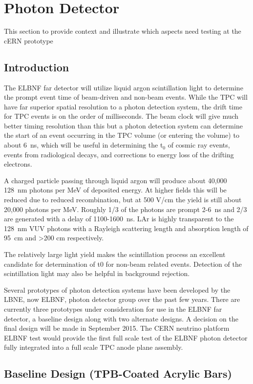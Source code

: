 \section{Photon Detector}
This section to provide context and illustrate which aspects need testing at the cERN prototype

\subsection{Introduction}

The ELBNF far detector will utilize liquid argon scintillation light to determine the prompt event time of beam-driven and non-beam events. While the TPC will have far superior spatial resolution to a photon detection system, the drift time for TPC events is on the order of milliseconds. The beam clock will give much better timing resolution than this but a photon detection system can determine the start of an event occurring in the TPC volume (or entering the volume) to about 6~ns, which will be useful in determining the t$_0$ of cosmic ray events, events from radiological decays, and corrections to energy loss of the drifting electrons. 

A charged particle passing through liquid argon will produce about 40,000 128~nm photons per MeV of deposited energy. At higher fields this will be reduced due to reduced recombination, but at 500 V/cm the yield is still about 20,000 photons per MeV. Roughly 1/3 of the photons are prompt 2-6~ns and 2/3 are generated with a delay of 1100-1600~ns. LAr is highly transparent to the 128~nm VUV photons with a Rayleigh scattering length and absorption length of 95~cm and >200 cm respectively. 

The relatively large light yield makes the scintillation process an excellent candidate for determination of t0 for non-beam related events. Detection of the scintillation light may also be helpful in background rejection.

Several prototypes of photon detection systems have been developed by the LBNE, now ELBNF, photon detector group over the past few years. There are currently three prototypes under consideration for use in the ELBNF far detector, a baseline design along with two alternate designs. A decision on the final design will be made in September 2015. The CERN neutrino platform ELBNF test would provide the first full scale test of the ELBNF photon detector fully integrated into a full scale TPC anode plane assembly. 

\subsection{Baseline Design (TPB-Coated Acrylic Bars)}

